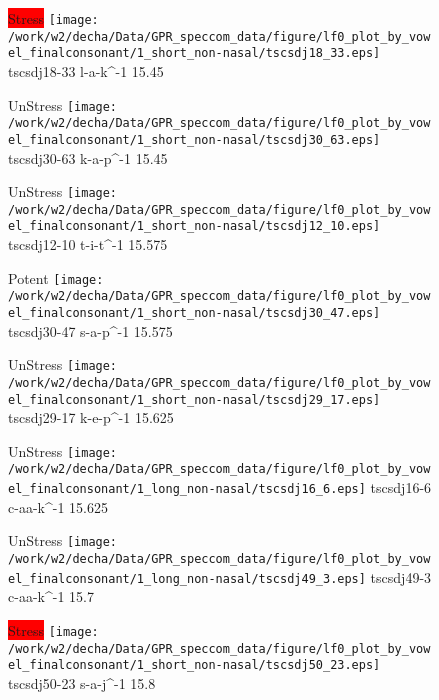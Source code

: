 \documentclass{article}
\begin{document}
\begin{figure}[t]
\begin{minipage}[b]{.24\textwidth}
\colorbox{red}{Stress}
\centering
\texttt{[image: /work/w2/decha/Data/GPR\_speccom\_data/figure/lf0\_plot\_by\_vowel\_finalconsonant/1\_short\_non-nasal/tscsdj18\_33.eps]}
tscsdj18-33 l-a-k\textasciicircum-1 15.45
\end{minipage}
\begin{minipage}[b]{.24\textwidth}
UnStress
\centering
\texttt{[image: /work/w2/decha/Data/GPR\_speccom\_data/figure/lf0\_plot\_by\_vowel\_finalconsonant/1\_short\_non-nasal/tscsdj30\_63.eps]}
tscsdj30-63 k-a-p\textasciicircum-1 15.45
\end{minipage}
\begin{minipage}[b]{.24\textwidth}
UnStress
\centering
\texttt{[image: /work/w2/decha/Data/GPR\_speccom\_data/figure/lf0\_plot\_by\_vowel\_finalconsonant/1\_short\_non-nasal/tscsdj12\_10.eps]}
tscsdj12-10 t-i-t\textasciicircum-1 15.575
\end{minipage}
\begin{minipage}[b]{.24\textwidth}
\colorbox{Apricot}{Potent}
\centering
\texttt{[image: /work/w2/decha/Data/GPR\_speccom\_data/figure/lf0\_plot\_by\_vowel\_finalconsonant/1\_short\_non-nasal/tscsdj30\_47.eps]}
tscsdj30-47 s-a-p\textasciicircum-1 15.575
\end{minipage}
\end{figure}

\begin{figure}[t]
\begin{minipage}[b]{.24\textwidth}
UnStress
\centering
\texttt{[image: /work/w2/decha/Data/GPR\_speccom\_data/figure/lf0\_plot\_by\_vowel\_finalconsonant/1\_short\_non-nasal/tscsdj29\_17.eps]}
tscsdj29-17 k-e-p\textasciicircum-1 15.625
\end{minipage}
\begin{minipage}[b]{.24\textwidth}
UnStress
\centering
\texttt{[image: /work/w2/decha/Data/GPR\_speccom\_data/figure/lf0\_plot\_by\_vowel\_finalconsonant/1\_long\_non-nasal/tscsdj16\_6.eps]}
tscsdj16-6 c-aa-k\textasciicircum-1 15.625
\end{minipage}
\begin{minipage}[b]{.24\textwidth}
UnStress
\centering
\texttt{[image: /work/w2/decha/Data/GPR\_speccom\_data/figure/lf0\_plot\_by\_vowel\_finalconsonant/1\_long\_non-nasal/tscsdj49\_3.eps]}
tscsdj49-3 c-aa-k\textasciicircum-1 15.7
\end{minipage}
\begin{minipage}[b]{.24\textwidth}
\colorbox{red}{Stress}
\centering
\texttt{[image: /work/w2/decha/Data/GPR\_speccom\_data/figure/lf0\_plot\_by\_vowel\_finalconsonant/1\_short\_non-nasal/tscsdj50\_23.eps]}
tscsdj50-23 s-a-j\textasciicircum-1 15.8
\end{minipage}
\end{figure}
\end{document}
